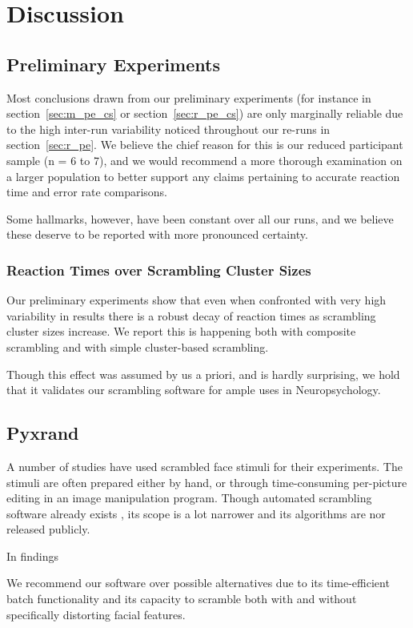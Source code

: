 \chapter{Discussion}
    \section{Preliminary Experiments}\label{sec:d_pe}
	Most conclusions drawn from our preliminary experiments (for instance in section~\ref{sec:m_pe_cs} or section~\ref{sec:r_pe_cs}) are only marginally reliable due to the high inter-run variability noticed throughout our re-runs in section~\ref{sec:r_pe}.
	We believe the chief reason for this is our reduced participant sample (n = 6 to 7), and we would recommend a more thorough examination on a larger population to better support any claims pertaining to accurate reaction time and error rate comparisons.
	
	Some hallmarks, however, have been constant over all our runs, and we believe these deserve to be reported with more pronounced certainty.
	\subsection{Reaction Times over Scrambling Cluster Sizes}
	    Our preliminary experiments show that even when confronted with very high variability in results there is a robust decay of reaction times as scrambling cluster sizes increase.
	    We report this is happening both with composite scrambling and with simple cluster-based scrambling.
	    
	    Though this effect was assumed by us a priori, and is hardly surprising, we hold that it validates our scrambling software for ample uses in Neuropsychology.
    \section{Pyxrand}
    A number of studies\citep{Rakover2013} have used scrambled face stimuli for their experiments.
    The stimuli are often prepared either by hand, or through time-consuming per-picture editing in an image manipulation program.
    Though automated scrambling software already exists \citep{Conway2008}, its scope is a lot narrower and its algorithms are nor released publicly.
    
    In findings 
    
    We recommend our software over possible alternatives due to its time-efficient batch functionality and its capacity to scramble both with and without specifically distorting facial features.
